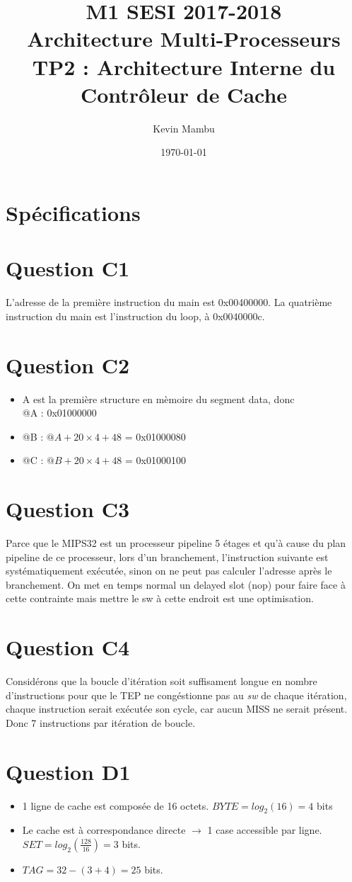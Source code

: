 \documentclass[10pt]{article}
\author{Kevin Mambu}
\date{\today}
\title{M1 SESI 2017-2018\\Architecture Multi-Processeurs\\TP2 : Architecture
Interne du Contrôleur de Cache}
\begin{document}
\maketitle

\section{Spécifications}

\section{Question C1}
L'adresse de la première instruction du main est 0x00400000. La quatrième
instruction du main est l'instruction du loop, à 0x0040000c.

\section{Question C2}
\begin{itemize}
  \item A est la première structure en mèmoire du segment data, donc\\
  @A : 0x01000000
  \item @B : $@A+20\times4+48$ = 0x01000080
  \item @C : $@B+20\times4+48$ = 0x01000100
\end{itemize}

\section{Question C3}
Parce que le MIPS32 est un processeur pipeline 5 étages et qu'à cause du plan
pipeline de ce processeur, lors d'un branchement, l'instruction suivante est
systématiquement exécutée, sinon on ne peut pas calculer l'adresse après le
branchement. On met en temps normal un delayed slot (nop) pour faire face à
cette contrainte mais mettre le sw à cette endroit est une optimisation.

\section{Question C4}
Considérons que la boucle d'itération soit suffisament longue en nombre
d'instructions pour que le TEP ne congéstionne pas au {\it sw} de chaque
itération, chaque instruction serait exécutée son cycle, car aucun MISS ne
serait présent. Donc 7 instructions par itération de boucle.

\section{Question D1}
\begin{itemize}
  \item 1 ligne de cache est composée de 16 octets. ${BYTE}=log_2(16)=4$ bits
  \item Le cache est à correspondance directe $\rightarrow$ 1 case accessible
  par ligne.\\
  ${SET}=log_2(\frac{128}{16})=3$ bits.
  \item ${TAG}=32-(3+4)=25$ bits.
\end{itemize}
\end{document}
